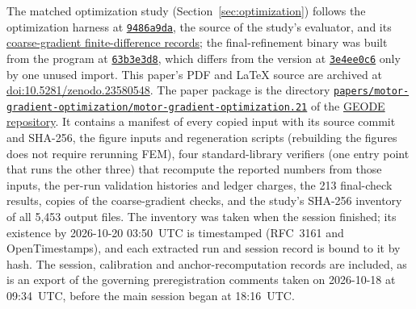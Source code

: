 \documentclass{anvil-paper}
\begin{document}
\begin{sloppypar}
The matched optimization study (Section~\ref{sec:optimization}) follows the
optimization harness at
\href{https://github.com/rjwalters/geode-fem/tree/9486a9da58beeca91968d4d3608f06b998abff45/benchmarks/motor_optimization}{\texttt{9486a9da}},
the source of the study's evaluator, and its
\href{https://github.com/rjwalters/geode-fem/tree/9486a9da58beeca91968d4d3608f06b998abff45/benchmarks/motor_optimization/runs}{coarse-gradient finite-difference records};
the final-refinement binary was built from the program at
\href{https://github.com/rjwalters/geode-fem/blob/63b3e3d8bbc30504f845eebb5b78e8be6a2ee12f/crates/geode-core/examples/icem_final_refinement.rs}{\texttt{63b3e3d8}},
which differs from the version at
\href{https://github.com/rjwalters/geode-fem/blob/3e4ee0c63a86dbf014a76c9faf04dd962da16911/crates/geode-core/examples/icem_final_refinement.rs}{\texttt{3e4ee0c6}}
only by one unused import.
This paper's PDF and \LaTeX{} source are archived at
\href{https://doi.org/10.5281/zenodo.23580548}{doi:10.5281/zenodo.23580548}.
The paper package is the directory
\href{https://github.com/rjwalters/geode-fem/tree/main/papers/motor-gradient-optimization/motor-gradient-optimization.21}{\texttt{papers/}\allowbreak\texttt{motor-gradient-optimization/}\allowbreak\texttt{motor-gradient-optimization.21}}
of the \href{https://github.com/rjwalters/geode-fem}{GEODE repository}. It
contains a manifest of every copied input with its source commit and
SHA-256, the figure inputs and regeneration scripts (rebuilding the figures
does not require rerunning FEM), four standard-library verifiers (one
entry point that runs the other three) that recompute the reported numbers
from those inputs, the per-run validation
histories and ledger charges, the 213 final-check results, copies of the
coarse-gradient checks, and the study's SHA-256 inventory of all 5,453
output files. The inventory was taken when the session finished; its
existence by 2026-10-20 03:50~UTC is timestamped (RFC~3161 and
OpenTimestamps), and each extracted run and session record is bound to it
by hash. The session, calibration and anchor-recomputation records are
included, as is an export of the governing preregistration comments taken
on 2026-10-18 at 09:34~UTC, before the main session began at 18:16~UTC.
\end{sloppypar}
\end{document}
